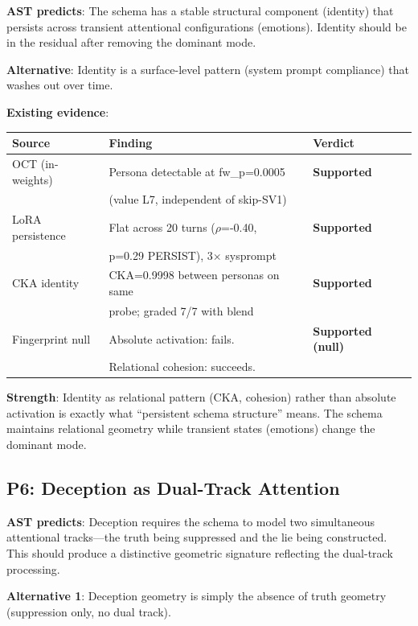 \documentclass[11pt,letterpaper]{article}
\begin{document}
\textbf{AST predicts}: The schema has a stable structural component
(identity) that persists across transient attentional configurations
(emotions). Identity should be in the residual after removing the
dominant mode.

\textbf{Alternative}: Identity is a surface-level pattern (system
prompt compliance) that washes out over time.

\textbf{Existing evidence}:

\begin{table}[H]
\centering
\begin{tabular}{lll}
\toprule
Source & Finding & Verdict \\
\midrule
OCT (in-weights) & Persona detectable at fw\_p=0.0005 &
  \textbf{Supported} \\
 & (value L7, independent of skip-SV1) & \\
LoRA persistence & Flat across 20 turns ($\rho$=-0.40, &
  \textbf{Supported} \\
 & p=0.29 PERSIST), 3$\times$ sysprompt & \\
CKA identity & CKA=0.9998 between personas on same &
  \textbf{Supported} \\
 & probe; graded 7/7 with blend & \\
Fingerprint null & Absolute activation: fails. &
  \textbf{Supported (null)} \\
 & Relational cohesion: succeeds. & \\
\bottomrule
\end{tabular}
\end{table}

\textbf{Strength}: Identity as relational pattern (CKA, cohesion)
rather than absolute activation is exactly what ``persistent schema
structure'' means. The schema maintains relational geometry while
transient states (emotions) change the dominant mode.

\subsection{P6: Deception as Dual-Track Attention}

\textbf{AST predicts}: Deception requires the schema to model two
simultaneous attentional tracks---the truth being suppressed and the
lie being constructed. This should produce a distinctive geometric
signature reflecting the dual-track processing.

\textbf{Alternative 1}: Deception geometry is simply the absence of
truth geometry (suppression only, no dual track).
\end{document}

